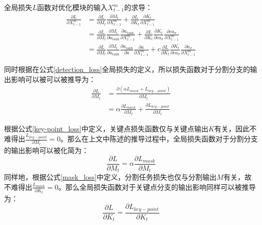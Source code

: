 \begin{corollary}
\label{corollary:loss2xm}
全局损失$L$函数对优化模块的输入$X^m_{t-1}$的求导：
\begin{equation*}
\begin{aligned}
\frac{\partial L}{\partial X^m_{t-1}} &= \frac{\partial L}{\partial M_t}\frac{\partial M_t}{\partial X^m_{t-1}} + \frac{\partial L}{\partial K_t}\frac{\partial K_t}{\partial X^m_{t-1}}\\
&=\frac{\partial L}{\partial M_t}\frac{\partial M_t}{\partial a_{\tanh}}\frac{\partial a_{\tanh}}{\partial X^m_{t-1}} + \frac{\partial L}{\partial K_t}\frac{\partial K_t}{\partial ca_{\sigma}}\frac{\partial ca_{\sigma}}{\partial X^m_{t-1}}\\
&=\frac{\partial L}{\partial M_t}\frac{\partial M_t}{\partial a_{\tanh}}\frac{\partial a_{\tanh}}{\partial a}\frac{\partial a}{\partial X^m_{t-1}} + c\frac{\partial L}{\partial K_t}\frac{\partial K_t}{\partial ca_{\sigma}}\frac{\partial a_{\sigma}}{\partial X^m_{t-1}}
\end{aligned}
\end{equation*}
\end{corollary}

同时根据在公式\eqref{detection_loss}全局损失的定义，所以损失函数对于分割分支的输出影响可以被可以被推导为：
\begin{equation*}
\begin{aligned}
\frac{\partial L}{\partial M_t} &= \frac{\partial (\alpha L_{mask} + L_{key-point})}{\partial M_t}\\
&= \alpha\frac{\partial L_{mask}}{\partial M_t} + \frac{\partial L_{key-point}}{\partial M_t}
\end{aligned}
\end{equation*}

根据公式\eqref{key-point_loss}中定义，关键点损失函数仅与关键点输出$K$有关，因此不难得出$\frac{L_{key-point}}{\partial M_t}=0$。那么在上文中陈述的推导过程中，全局损失函数对于分割分支的输出影响可以被化简为：
\begin{equation}
\label{eq:L2Mt}
\frac{\partial L}{\partial M_t} = \alpha\frac{\partial L_{mask}}{\partial M_t}
\end{equation}
同样地，根据公式\eqref{mask_loss}中定义，分割任务损失也仅与分割输出$M$有关，故不难得出$\frac{L_{mask}}{\partial K_t}=0$。那么全局损失函数对于关键点分支的输出影响同样可以被推导为：
\begin{equation}
\label{eq:L2Kt}
\frac{\partial L}{\partial K_t} = \frac{\partial L_{key-point}}{\partial K_t}
\end{equation}

